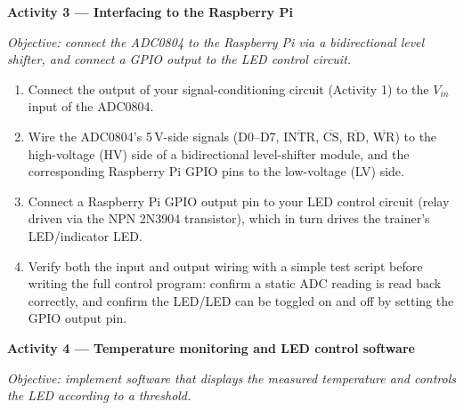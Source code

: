 \begin{procedure}
  \textbf{Activity 3 --- Interfacing to the Raspberry Pi}\vspace{2pt}

  \textit{Objective: connect the ADC0804 to the Raspberry Pi via a bidirectional level shifter, and connect a GPIO output to the LED control circuit.}

  \begin{enumerate}
    \item Connect the output of your signal-conditioning circuit (Activity 1) to the $V_{in}$ input of the ADC0804.
    \item Wire the ADC0804's 5\,V-side signals (D0--D7, $\overline{\text{INTR}}$, $\overline{\text{CS}}$, $\overline{\text{RD}}$, $\overline{\text{WR}}$) to the high-voltage (HV) side of a bidirectional level-shifter module, and the corresponding Raspberry Pi GPIO pins to the low-voltage (LV) side.
    \item Connect a Raspberry Pi GPIO output pin to your LED control circuit (relay driven via the NPN 2N3904 transistor), which in turn drives the trainer's LED/indicator LED.
    \item Verify both the input and output wiring with a simple test script before writing the full control program: confirm a static ADC reading is read back correctly, and confirm the LED/LED can be toggled on and off by setting the GPIO output pin.
  \end{enumerate}

  \textbf{Activity 4 --- Temperature monitoring and LED control software}\vspace{2pt}

  \textit{Objective: implement software that displays the measured temperature and controls the LED according to a threshold.}


\end{procedure}
